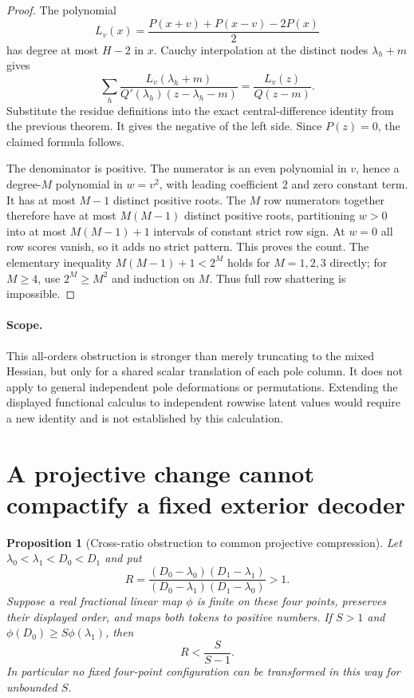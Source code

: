 \documentclass[11pt]{article}
\newtheorem{proposition}[theorem]{Proposition}
\begin{document}
\begin{proof}
The polynomial
\[
 L_v(x)=\frac{P(x+v)+P(x-v)-2P(x)}2
\]
has degree at most $H-2$ in $x$. Cauchy interpolation at the distinct
nodes $\lambda_h+m$ gives
\[
 \sum_h\frac{L_v(\lambda_h+m)}
 {Q'(\lambda_h)(z-\lambda_h-m)}=\frac{L_v(z)}{Q(z-m)}.
\]
Substitute the residue definitions into the exact central-difference
identity from the previous theorem. It gives the negative of the left
side. Since $P(z)=0$, the claimed formula follows.

The denominator is positive. The numerator is an even polynomial in
$v$, hence a degree-$M$ polynomial in $w=v^2$, with leading coefficient
$2$ and zero constant term. It has at most $M-1$ distinct positive roots.
The $M$ row numerators together therefore have at most $M(M-1)$ distinct
positive roots, partitioning $w>0$ into at most $M(M-1)+1$ intervals of
constant strict row sign. At $w=0$ all row scores vanish, so it adds no
strict pattern. This proves the count. The elementary inequality
$M(M-1)+1<2^M$ holds for $M=1,2,3$ directly; for $M\ge4$, use
$2^M\ge M^2$ and induction on $M$. Thus full row shattering is impossible.
\end{proof}

\paragraph{Scope.}
This all-orders obstruction is stronger than merely truncating to the
mixed Hessian, but only for a shared scalar translation of each pole
column. It does not apply to general independent pole deformations or
permutations. Extending the displayed functional calculus to independent
rowwise latent values would require a new identity and is not established
by this calculation.

\section{A projective change cannot compactify a fixed exterior decoder}

\begin{proposition}[Cross-ratio obstruction to common projective compression]
Let $\lambda_0<\lambda_1<D_0<D_1$ and put
\[
 R=\frac{(D_0-\lambda_0)(D_1-\lambda_1)}
         {(D_0-\lambda_1)(D_1-\lambda_0)}>1.
\]
Suppose a real fractional linear map $\phi$ is finite on these four
points, preserves their displayed order, and maps both tokens to
positive numbers. If $S>1$ and
$\phi(D_0)\ge S\phi(\lambda_1)$, then
\[
 R<\frac{S}{S-1}.
\]
In particular no fixed four-point configuration can be transformed in
this way for unbounded $S$.
\end{proposition}
\end{document}
